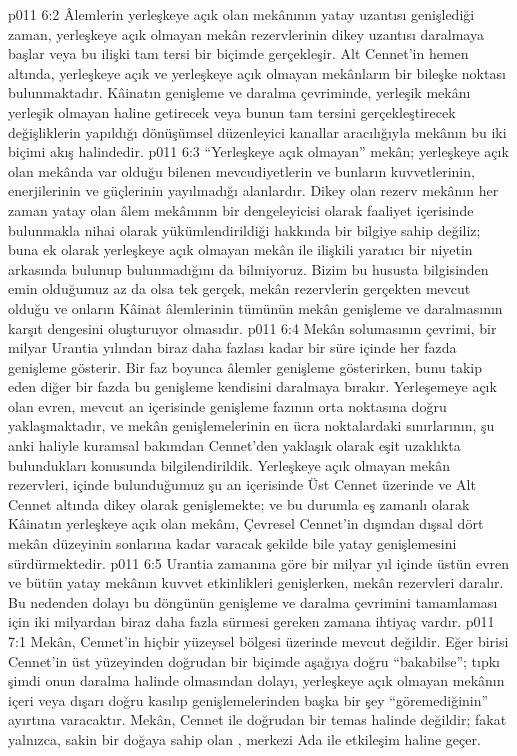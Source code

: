 \vs p011 6:2 Âlemlerin yerleşkeye açık olan mekânının yatay uzantısı genişlediği zaman, yerleşkeye açık olmayan mekân rezervlerinin dikey uzantısı daralmaya başlar veya bu ilişki tam tersi bir biçimde gerçekleşir. Alt Cennet’in hemen altında, yerleşkeye açık ve yerleşkeye açık olmayan mekânların bir bileşke noktası bulunmaktadır. Kâinatın genişleme ve daralma çevriminde, yerleşik mekânı yerleşik olmayan haline getirecek veya bunun tam tersini gerçekleştirecek değişliklerin yapıldığı dönüşümsel düzenleyici kanallar aracılığıyla mekânın bu iki biçimi akış halindedir.
\vs p011 6:3 “Yerleşkeye açık olmayan” mekân; yerleşkeye açık olan mekânda var olduğu bilenen mevcudiyetlerin ve bunların kuvvetlerinin, enerjilerinin ve güçlerinin yayılmadığı alanlardır. Dikey olan rezerv mekânın her zaman yatay olan âlem mekânının bir dengeleyicisi olarak faaliyet içerisinde bulunmakla nihai olarak yükümlendirildiği hakkında bir bilgiye sahip değiliz; buna ek olarak yerleşkeye açık olmayan mekân ile ilişkili yaratıcı bir niyetin arkasında bulunup bulunmadığını da bilmiyoruz. Bizim bu hususta bilgisinden emin olduğumuz az da olsa tek gerçek, mekân rezervlerin gerçekten mevcut olduğu ve onların Kâinat âlemlerinin tümünün mekân genişleme ve daralmasının karşıt dengesini oluşturuyor olmasıdır.
\vs p011 6:4 Mekân solumasının çevrimi, bir milyar Urantia yılından biraz daha fazlası kadar bir süre içinde her fazda genişleme gösterir. Bir faz boyunca âlemler genişleme gösterirken, bunu takip eden diğer bir fazda bu genişleme kendisini daralmaya bırakır. Yerleşemeye açık olan evren, mevcut an içerisinde genişleme fazının orta noktasına doğru yaklaşmaktadır, ve mekân genişlemelerinin en ücra noktalardaki sınırlarının, şu anki haliyle kuramsal bakımdan Cennet’den yaklaşık olarak eşit uzaklıkta bulundukları konusunda bilgilendirildik. Yerleşkeye açık olmayan mekân rezervleri, içinde bulunduğumuz şu an içerisinde Üst Cennet üzerinde ve Alt Cennet altında dikey olarak genişlemekte; ve bu durumla eş zamanlı olarak Kâinatın yerleşkeye açık olan mekânı, Çevresel Cennet’in dışından dışsal dört mekân düzeyinin sonlarına kadar varacak şekilde bile yatay genişlemesini sürdürmektedir.
\vs p011 6:5 Urantia zamanına göre bir milyar yıl içinde üstün evren ve bütün yatay mekânın kuvvet etkinlikleri genişlerken, mekân rezervleri daralır. Bu nedenden dolayı bu döngünün genişleme ve daralma çevrimini tamamlaması için iki milyardan biraz daha fazla sürmesi gereken zamana ihtiyaç vardır.
\vs p011 7:1 Mekân, Cennet’in hiçbir yüzeysel bölgesi üzerinde mevcut değildir. Eğer birisi Cennet’in üst yüzeyinden doğrudan bir biçimde aşağıya doğru “bakabilse”; tıpkı şimdi onun daralma halinde olmasından dolayı, yerleşkeye açık olmayan mekânın içeri veya dışarı doğru kasılıp genişlemelerinden başka bir şey “göremediğinin” ayırtına varacaktır. Mekân, Cennet ile doğrudan bir temas halinde değildir; fakat yalnızca, sakin bir doğaya sahip olan , merkezi Ada ile etkileşim haline geçer.
